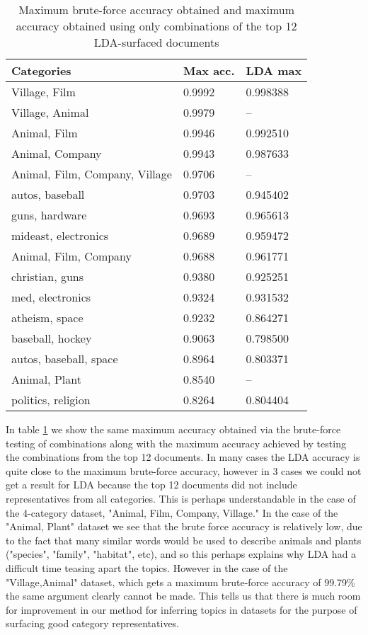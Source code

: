 \documentclass{article} %
\begin{document}
\begin{table}[]
\centering
\captionsetup{position=bottom}
\begin{tabular}{lll}
\toprule
Categories                  & Max acc. & LDA max \\
\midrule
Village, Film                & 0.9992       & 0.998388    \\
Village, Animal              & 0.9979       & --         \\
Animal, Film                 & 0.9946       & 0.992510    \\
Animal, Company              & 0.9943       & 0.987633    \\
Animal, Film, Company, Village & 0.9706       & --         \\
autos, baseball              & 0.9703       & 0.945402    \\
guns, hardware               & 0.9693       & 0.965613    \\
mideast, electronics         & 0.9689       & 0.959472    \\
Animal, Film, Company         & 0.9688       & 0.961771    \\
christian, guns              & 0.9380       & 0.925251    \\
med, electronics             & 0.9324       & 0.931532    \\
atheism, space               & 0.9232       & 0.864271    \\
baseball, hockey             & 0.9063       & 0.798500    \\
autos, baseball, space        & 0.8964       & 0.803371    \\
Animal, Plant                & 0.8540       & --         \\
politics, religion           & 0.8264       & 0.804404   \\
\bottomrule
\end{tabular}
\caption{Maximum brute-force accuracy obtained and maximum accuracy obtained using only combinations of the top 12 LDA-surfaced documents}\label{ldaacc}
\end{table}

In table \ref{ldaacc} we show the same maximum accuracy obtained via the brute-force testing of combinations along with the maximum accuracy achieved by testing the combinations from the top 12 documents. In many cases the LDA accuracy is quite close to the maximum brute-force accuracy, however in 3 cases we could not get a result for LDA because the top 12 documents did not include representatives from all categories. This is perhaps understandable in the case of the 4-category dataset, "Animal, Film, Company, Village." In the case of the "Animal, Plant" dataset we see that the brute force accuracy is relatively low, due to the fact that many similar words would be used to describe animals and plants ("species", "family", "habitat", etc), and so this perhaps explains why LDA had a difficult time teasing apart the topics. However in the case of the "Village,Animal" dataset, which gets a maximum brute-force accuracy of 99.79\% the same argument clearly cannot be made. This tells us that there is much room for improvement in our method for inferring topics in datasets for the purpose of surfacing good category representatives.
\end{document}
